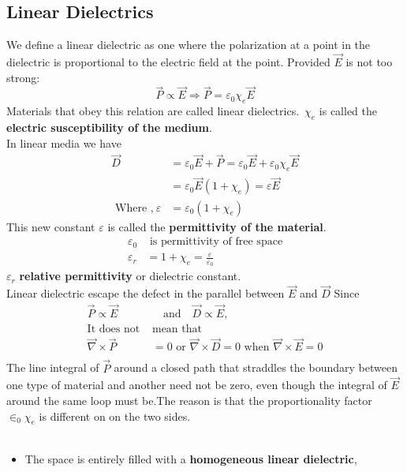  \subsection{Linear Dielectrics}
 We define a linear dielectric as one where the polarization at a point in the dielectric  is proportional to the  electric field at the point. Provided ${\vec{E}}$ is not too strong: $$\vec{P} \propto \vec{E} \Rightarrow \vec{P}=\varepsilon_{0} \chi_{e} \vec{E}$$
 Materials that obey this relation are called linear dielectrics.\ $\chi_{e}$ is called the \textbf{electric susceptibility of the medium}.\\
 In linear media we have
 \begin{align*}
\vec{D}&=\varepsilon_{0} \vec{E}+\vec{P}=\varepsilon_{0} \vec{E}+\varepsilon_{0} \chi_{e} \vec{E}\\&=\varepsilon_{0} \vec{E}\left(1+\chi_{e}\right)=\varepsilon \vec{E} \\\text { Where ,}\  \varepsilon&=\varepsilon_{0}\left(1+\chi_{e}\right)
 \end{align*}
 This new constant $\varepsilon$ is called the \textbf{permittivity of the material}.
 \begin{align*}
  \varepsilon_{0}&\text{ is permittivity of free space}\\
 \varepsilon_r&=1+\chi_{e}=\frac{\varepsilon}{\varepsilon_{0}}
 \end{align*}
 $\varepsilon_r$ \textbf{relative permittivity} or dielectric constant.\\
 Linear dielectric escape the defect in the parallel between $\vec{E}$ and $\vec{D}$ Since 
 \begin{align*}
   \vec{ P}\propto \vec{E} &\quad\text{and}\quad\vec{ D}\propto \vec{E} ,\\
 \text{It does not  }&\text{mean that}\\
 \vec{\nabla}\times \vec{P}&=0 \text{ or }\vec{\nabla}\times \vec{ D}=0 \text{ when }\vec{ \nabla}\times \vec{E}=0\\
 \end{align*}
 The line integral of $\vec{P}$ around a closed path that straddles the boundary between one type of material and another need not be zero, even though the integral of $\vec{E}$ around the same loop must be.The reason is that the proportionality factor $\in_{0}\chi_{e}$ is different on on the two sides.\\\\
 \begin{itemize}
 	\item The space is entirely filled with a \textbf{homogeneous linear dielectric},
 \end{itemize}
